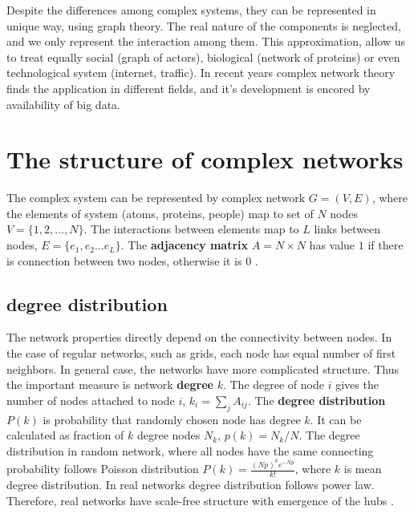Despite the differences among complex systems, they can be represented in unique way, using graph theory. The real nature of the components is neglected, and we only represent the interaction among them. This approximation, allow us to treat equally social (graph of actors), biological (network of proteins) or even technological system (internet, traffic). In recent years complex network theory finds the application in different fields, and it's development is encored by availability of big data.


\section{The structure of complex networks}

The complex system can be represented by complex network $G=(V, E)$, where the elements of system (atoms, proteins, people) map to set of $N$ nodes $V=\{1, 2, ...,N\}$. The interactions between elements map to $L$ links between nodes, $E = \{ e_1, e_2... e_L\}$. The \textbf{adjacency matrix} ${A} = N \times N$ has value $1$ if there is connection between two nodes, otherwise it is $0$ \cite{boccaletti2006}. 

\subsection{degree distribution}

The network properties directly depend on the connectivity between nodes. In the case of regular networks, such as grids, each node has equal number of first neighbors. In general case, the networks have more complicated structure. Thus the important measure is network \textbf{degree} $k$. The degree of node $i$ gives the number of nodes attached to node $i$, $k_i = \sum_j A_{ij}$. The \textbf{degree distribution} $P(k)$ is probability that randomly chosen node has degree $k$. It can be calculated as fraction of $k$ degree nodes $N_k$, $p(k) = N_k/N$. The degree distribution in random network, where all nodes have the same connecting probability follows Poisson distribution $P(k)= \frac{(Np)^ke^{-Np}}{k!}$, where $k$ is mean degree distribution. In real networks degree distribution follows power law. Therefore, real networks have scale-free structure with emergence of the hubs \cite{newman2010}.

